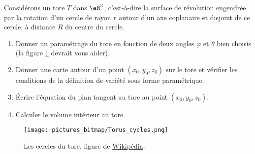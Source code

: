 
\begin{exercice}\label{exoTP20090003}


Considérons un tore $T$ dans $\eR^3$, c’est-à-dire la surface de révolution engendrée par la rotation d’un cercle de rayon $r$ autour d’un axe coplanaire et disjoint de ce cercle, à distance $R$ du centre du cercle.
\begin{enumerate}

	\item
		Donner un paramétrage du tore en fonction de deux angles $\varphi$ et $\theta$ bien choisis (la figure \ref{FigToreWiki} devrait vous aider).
	\item
		Donner une carte autour d’un point $(x_0 , y_0 , z_0 )$ sur le tore et vérifier les conditions de la définition de variété sous forme paramétrique.
	\item
		Écrire l'équation du plan tangent au tore au point $(x_0 , y_0 , z_0 )$.
	\item
		Calculer le volume intérieur au tore.

\end{enumerate}

\begin{figure}
	\texttt{[image: pictures\_bitmap/Torus\_cycles.png]}
	\caption{Les cercles du tore, figure de \href{http://fr.wikipedia.org/wiki/Tore}{Wikipédia}.}\label{FigToreWiki}
\end{figure}

\end{exercice}
